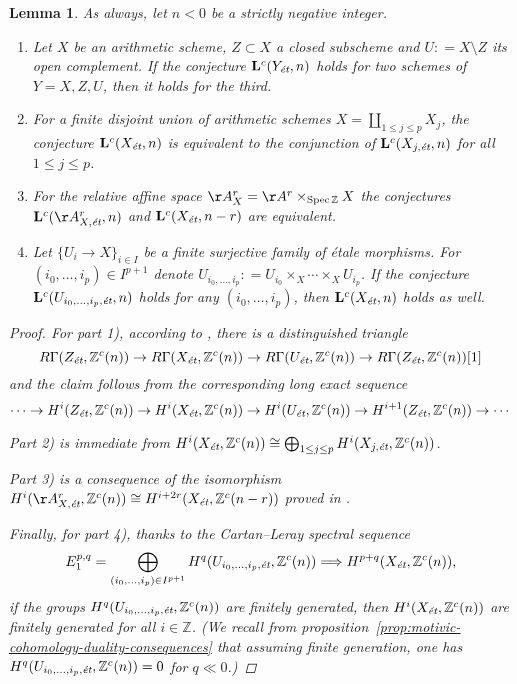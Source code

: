 \documentclass[leqno,12pt]{article}
\theoremstyle{plain}
\newtheorem{lemma}[theorem]{\indent\sc Lemma}
\theoremstyle{definition}
\DeclareMathOperator{\Spec}{Spec}
\newcommand{\ZZ}{\mathbb{Z}}
\newcommand{\dfn}{\mathrel{\mathop:}=}
\newcommand{\et}{\text{\it \'{e}t}}
\begin{document}
\begin{lemma}
  \label{lemma:Lc(Xet)-operations}
  As always, let $n < 0$ be a strictly negative integer.

  \begin{enumerate}
  \item[$1)$] Let $X$ be an arithmetic scheme, $Z \subset X$ a closed subscheme
    and $U \dfn X\setminus Z$ its open complement. If the conjecture
    $\mathbf{L}^c (Y_\et,n)$ holds for two schemes of $Y = X,Z,U$, then it holds
    for the third.

  \item[$2)$] For a finite disjoint union of arithmetic schemes
    $X = \coprod_{1 \le j \le p} X_j$, the conjecture $\mathbf{L}^c (X_\et,n)$
    is equivalent to the conjunction of $\mathbf{L}^c (X_{j,\et},n)$ for all
    $1 \le j \le p$.

  \item[$3)$] For the relative affine space $\AA^r_X = \AA^r \times_{\Spec \ZZ} X$
    the conjectures $\mathbf{L}^c (\AA^r_{X,\et},n)$ and
    $\mathbf{L}^c (X_\et,n-r)$ are equivalent.

  \item[$4)$] Let $\{ U_i \to X \}_{i \in I}$ be a finite surjective family of
    \'{e}tale morphisms. For $(i_0,\ldots,i_p) \in I^{p+1}$ denote
    $U_{i_0,\ldots,i_p} \dfn U_{i_0} \times_X \cdots \times_X U_{i_p}$.
    If the conjecture $\mathbf{L}^c (U_{i_0,\ldots,i_p, \et},n)$ holds for any
    $(i_0,\ldots,i_p)$, then $\mathbf{L}^c (X_\et,n)$ holds as well.
  \end{enumerate}

  \begin{proof}
    For part 1), according to \cite[Corollary~7.2]{Geisser-2010}, there is a
    distinguished triangle
    \[ R\Gamma (Z_\et, \ZZ^c (n)) \to
       R\Gamma (X_\et, \ZZ^c (n)) \to
       R\Gamma (U_\et, \ZZ^c (n)) \to
       R\Gamma (Z_\et, \ZZ^c (n)) [1] \]
    and the claim follows from the corresponding long exact sequence
    \[ \cdots \to H^i (Z_\et, \ZZ^c (n)) \to
       H^i (X_\et, \ZZ^c (n)) \to
       H^i (U_\et, \ZZ^c (n)) \to
       H^{i+1} (Z_\et, \ZZ^c (n)) \to \cdots \]

    Part 2) is immediate from
    $H^i (X_\et, \ZZ^c (n)) \cong \bigoplus_{1 \le j \le p} H^i (X_{j,\et}, \ZZ^c (n))$.

    Part 3) is a consequence of the isomorphism
    $H^i (\AA^r_{X,\et}, \ZZ^c (n)) \cong H^{i+2r} (X_\et, \ZZ^c (n-r))$
    proved in \cite[Lemma~5.11]{Morin-2014}.

    Finally, for part 4), thanks to the Cartan--Leray spectral sequence
    \[ E_1^{p,q} = \bigoplus_{(i_0,\ldots,i_p) \in I^{p+1}} H^q (U_{i_0,\ldots,i_p, \et}, \ZZ^c (n))
      \Longrightarrow H^{p+q} (X_\et, \ZZ^c (n)), \]
    if the groups $H^q (U_{i_0,\ldots,i_p, \et}, \ZZ^c (n))$ are finitely
    generated, then $H^i (X_\et, \ZZ^c (n))$ are finitely generated for all
    $i\in \ZZ$.
    (We recall from
    proposition~\ref{prop:motivic-cohomology-duality-consequences} that assuming
    finite generation, one has $H^q (U_{i_0,\ldots,i_p, \et}, \ZZ^c (n)) = 0$
    for $q \ll 0$.)
  \end{proof}
\end{lemma}
\end{document}

